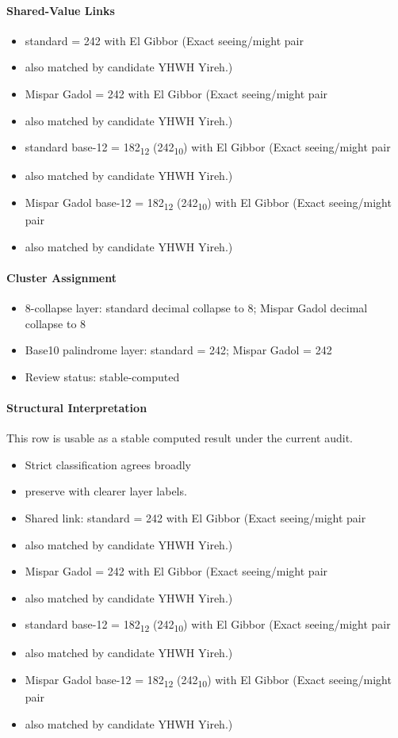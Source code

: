 \paragraph{Shared-Value Links}
\begin{itemize}
\item standard = 242 with El Gibbor (Exact seeing/might pair
\item also matched by candidate YHWH Yireh.)
\item Mispar Gadol = 242 with El Gibbor (Exact seeing/might pair
\item also matched by candidate YHWH Yireh.)
\item standard base-12 = 182\textsubscript{12} (242\textsubscript{10}) with El Gibbor (Exact seeing/might pair
\item also matched by candidate YHWH Yireh.)
\item Mispar Gadol base-12 = 182\textsubscript{12} (242\textsubscript{10}) with El Gibbor (Exact seeing/might pair
\item also matched by candidate YHWH Yireh.)
\end{itemize}
\paragraph{Cluster Assignment}
\begin{itemize}
\item 8-collapse layer: standard decimal collapse to 8; Mispar Gadol decimal collapse to 8
\item Base10 palindrome layer: standard = 242; Mispar Gadol = 242
\item Review status: stable-computed
\end{itemize}
\paragraph{Structural Interpretation}
This row is usable as a stable computed result under the current audit.

\begin{itemize}
\item Strict classification agrees broadly
\item preserve with clearer layer labels.
\item Shared link: standard = 242 with El Gibbor (Exact seeing/might pair
\item also matched by candidate YHWH Yireh.)
\item Mispar Gadol = 242 with El Gibbor (Exact seeing/might pair
\item also matched by candidate YHWH Yireh.)
\item standard base-12 = 182\textsubscript{12} (242\textsubscript{10}) with El Gibbor (Exact seeing/might pair
\item also matched by candidate YHWH Yireh.)
\item Mispar Gadol base-12 = 182\textsubscript{12} (242\textsubscript{10}) with El Gibbor (Exact seeing/might pair
\item also matched by candidate YHWH Yireh.)
\end{itemize}


